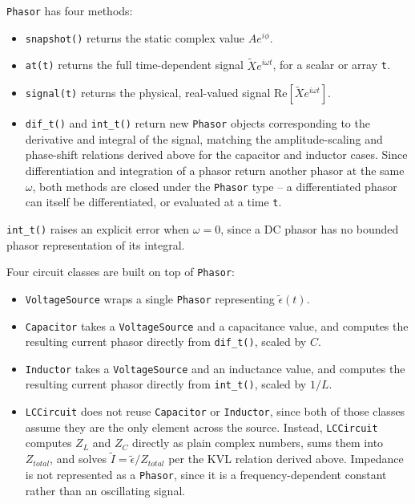 \documentclass[11pt]{article}
\begin{document}
\texttt{Phasor} has four methods:

\begin{itemize}
    \item \texttt{snapshot()} returns the static complex value $Ae^{i\phi}$.
    \item \texttt{at(t)} returns the full time-dependent signal $\tilde{X}e^{i\omega t}$, for a scalar or array \texttt{t}.
    \item \texttt{signal(t)} returns the physical, real-valued signal $\text{Re}[\tilde{X}e^{i\omega t}]$.
    \item \texttt{dif\_t()} and \texttt{int\_t()} return new \texttt{Phasor} objects corresponding to the derivative and integral of the signal, matching the amplitude-scaling and phase-shift relations derived above for the capacitor and inductor cases. Since differentiation and integration of a phasor return another phasor at the same $\omega$, both methods are closed under the \texttt{Phasor} type -- a differentiated phasor can itself be differentiated, or evaluated at a time \texttt{t}.
\end{itemize}

\texttt{int\_t()} raises an explicit error when $\omega = 0$, since a DC phasor has no bounded phasor representation of its integral.

Four circuit classes are built on top of \texttt{Phasor}:

\begin{itemize}
    \item \texttt{VoltageSource} wraps a single \texttt{Phasor} representing $\tilde{\epsilon}(t)$.
    \item \texttt{Capacitor} takes a \texttt{VoltageSource} and a capacitance value, and computes the resulting current phasor directly from \texttt{dif\_t()}, scaled by $C$.
    \item \texttt{Inductor} takes a \texttt{VoltageSource} and an inductance value, and computes the resulting current phasor directly from \texttt{int\_t()}, scaled by $1/L$.
    \item \texttt{LCCircuit} does not reuse \texttt{Capacitor} or \texttt{Inductor}, since both of those classes assume they are the only element across the source. Instead, \texttt{LCCircuit} computes $Z_L$ and $Z_C$ directly as plain complex numbers, sums them into $Z_{total}$, and solves $\tilde{I} = \tilde{\epsilon}/Z_{total}$ per the KVL relation derived above. Impedance is not represented as a \texttt{Phasor}, since it is a frequency-dependent constant rather than an oscillating signal.
\end{itemize}
\end{document}
